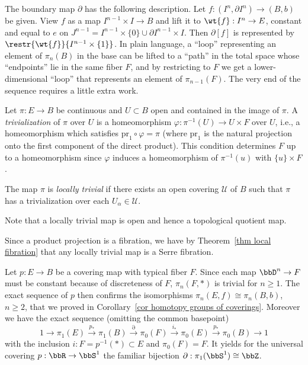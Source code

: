 The boundary map $\partial$ has the following description. Let $f:(I^n,\partial I^n)\to (B,b)$ be given. View $f$ as a map $I^{n-1}\times I\to B$ and lift it to $\wt{f}:I^n\to E$, constant and equal to $e$ on $J^{n-1}=I^{n-1}\times \{0\}\cup \partial I^{n-1}\times I$. Then $\partial[f]$ is represented by $\restr{\wt{f}}{I^{n-1}\times \{1\}}$. In plain language, a ``loop'' representing an element of $\pi_n(B)$ in the base can be lifted to a ``path'' in the total space whose ``endpoints'' lie in the same fiber $F$, and by restricting to $F$ we get a lower-dimensional ``loop'' that represents an element of $\pi_{n-1}(F)$. The very end of the sequence requires a little extra work.

\begin{defn}[Trivialization]
    Let $\pi :E\to B$ be continuous and $U\subset B$ open and contained in the image of $\pi$. A \emph{trivialization} of $\pi$ over $U$ is a homeomorphism $\varphi:\pi^{-1}(U)\to U\times F$ over $U$, i.e., a homeomorphism which satisfies $\mathrm{pr}_1\circ \varphi=\pi$ (where $\mathrm{pr}_1$ is the natural projection onto the first component of the direct product). This condition determines $F$ up to a homeomorphism since $\varphi$ induces a homeomorphism of $\pi^{-1}(u)$ with $\{u\}\times F$.
\end{defn}

\begin{defn}
    The map $\pi$ is \emph{locally trivial} if there exists an open covering $\mathcal{U}$ of $B$ such that $\pi$ has a trivialization over each $U_\alpha\in \mathcal{U}$. 
\end{defn}

Note that a locally trivial map is open and hence a topological quotient map.

\begin{example}
    Since a product projection is a fibration, we have by Theorem~\ref{thm local fibration} that any locally trivial map is a Serre fibration.
\end{example}
\begin{example}
    Let $p:E\to B$ be a covering map with typical fiber $F$. Since each map $\bbD^n\to F$ must be constant because of discreteness of $F$, $\pi_n(F,*)$ is trivial for $n\geq 1$. The exact sequence of $p$ then confirms the isomorphisms $\pi_n(E,f)\cong \pi_n(B,b)$, $n\geq 2$, that we proved in Corollary~\ref{cor homotopy groups of coverings}. Moreover we have the exact sequence (omitting the common basepoint)
    \[1\to \pi_1(E)\overset{p_\ast}{\to} \pi_1(B)\overset{\partial}{\to} \pi_0(F)\overset{i_\ast}{\to} \pi_0(E)\overset{p_\ast}{\to} \pi_0(B)\to 1\]
    with the inclusion $i:F=p^{-1}(*)\subset E$ and $\pi_0(F)=F$. It yields for the universal covering $p:\bbR \to \bbS^1$ the familiar bijection $\partial:\pi_1(\bbS^1)\cong \bbZ$.
\end{example}

